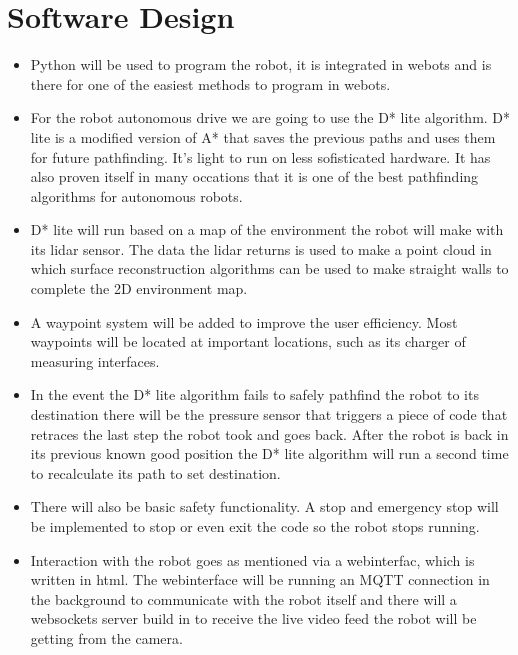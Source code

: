 \documentclass[a4paper]{article}
\begin{document}
\section*{Software Design}
\begin{itemize}
    \item Python will be used to program the robot, it is integrated in webots and is there for one of the easiest methods to program in webots.
    \item For the robot autonomous drive we are going to use the D* lite algorithm. D* lite is a modified version of A* that saves the previous paths and uses them for future pathfinding. It's light to run on less sofisticated hardware. It has also proven itself in many occations that it is one of the best pathfinding algorithms for autonomous robots.
    \item D* lite will run based on a map of the environment the robot 
    will make with its lidar sensor. The data the lidar returns is used to make a point cloud in which surface reconstruction algorithms can be used to make straight walls to complete the 2D environment map.
    \item A waypoint system will be added to improve the user efficiency. Most waypoints will be located at important locations, such as its charger of measuring interfaces. 
    \item In the event the D* lite algorithm fails to safely pathfind the robot to its destination there will be the pressure sensor that triggers a piece of code that retraces the last step the robot took and goes back. After the robot is back in its previous known good position the D* lite algorithm will run a second time to recalculate its path to set destination.
    \item There will also be basic safety functionality. A stop and emergency stop will be implemented to stop or even exit the code so the robot stops running.
    \item Interaction with the robot goes as mentioned via a webinterfac, which is written in html. The webinterface will be running an MQTT connection in the background to communicate with the robot itself and there will a websockets server build in to receive the live video feed the robot will be getting from the camera.
\end{itemize}
\end{document}
